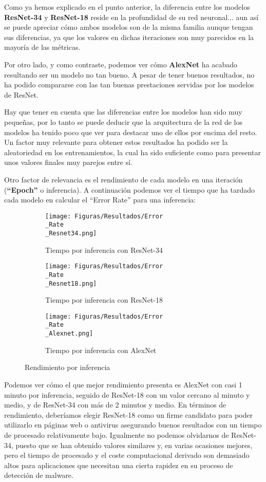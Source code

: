 Como ya hemos explicado en el punto anterior, la diferencia entre los modelos \textbf{ResNet-34} y \textbf{ResNet-18} reside en la profundidad de su red neuronal... aun así se puede apreciar cómo ambos modelos son de la misma familia aunque tengan sus diferencias, ya que los valores en dichas iteraciones son muy parecidos en la mayoría de las métricas.

Por otro lado, y como contraste, podemos ver cómo \textbf{AlexNet} ha acabado resultando ser un modelo no tan bueno. A pesar de tener buenos resultados, no ha podido compararse con las tan buenas prestaciones servidas por los modelos de ResNet.

Hay que tener en cuenta que las diferencias entre los modelos han sido muy pequeñas, por lo tanto se puede deducir que la arquitectura de la red de los modelos ha tenido poco que ver para destacar uno de ellos por encima del resto. Un factor muy relevante para obtener estos resultados ha podido ser la aleatoriedad en los entrenamientos, la cual ha sido suficiente como para presentar unos valores finales muy parejos entre sí.

Otro factor de relevancia es el rendimiento de cada modelo en una iteración (\textbf{``Epoch''} o inferencia). A continuación podemos ver el tiempo que ha tardado cada modelo en calcular el ``Error Rate'' para una inferencia:

\begin{figure}[H]
  \centering
  \begin{subfigure}[H]{0.45\linewidth}
  	\texttt{[image: Figuras/Resultados/Error\\\_Rate\\\_Resnet34.png]}
  	\caption{Tiempo por inferencia con ResNet-34}
  \end{subfigure}
  \begin{subfigure}[H]{0.45\linewidth}
  	\texttt{[image: Figuras/Resultados/Error\\\_Rate\\\_Resnet18.png]}
  	\caption{Tiempo por inferencia con ResNet-18}
  \end{subfigure}
  \begin{subfigure}[H]{0.45\linewidth}
  	\texttt{[image: Figuras/Resultados/Error\\\_Rate\\\_Alexnet.png]}
  	\caption{Tiempo por inferencia con AlexNet}
  \end{subfigure}
  \caption{Rendimiento por inferencia}
\end{figure}

Podemos ver cómo el que mejor rendimiento presenta es AlexNet con casi 1 minuto por inferencia, seguido de ResNet-18 con un valor cercano al minuto y medio, y de ResNet-34 con más de 2 minutos y medio. En términos de rendimiento, deberíamos elegir ResNet-18 como un firme candidato para poder utilizarlo en páginas web o antivirus asegurando buenos resultados con un tiempo de procesado relativamente bajo. Igualmente no podemos olvidarnos de ResNet-34, puesto que se han obtenido valores similares y, en varias ocasiones mejores, pero el tiempo de procesado y el coste computacional derivado son demasiado altos para aplicaciones que necesitan una cierta rapidez en su proceso de detección de malware.

